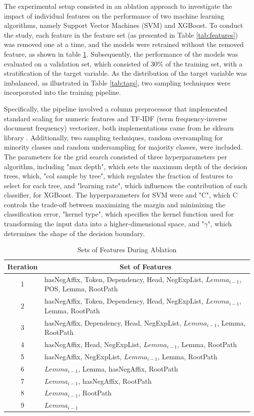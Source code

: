 The experimental setup consisted in an ablation approach to investigate the impact of individual features on the performance of two machine learning algorithms, namely Support Vector Machines (SVM) and XGBoost. To conduct the study, each feature in the feature set (as presented in Table \ref{tab:features}) was removed one at a time, and the models were retrained without the removed feature, as shown in table \ref{tab:ablation}. Subsequently, the performance of the models was evaluated on a validation set, which consisted of 30\% of the training set, with a stratification of the target variable. As the distribution of the target variable was imbalanced, as illustrated in Table \ref{tab:tags}, two sampling techniques were incorporated into the training pipeline.

Specifically, the pipeline involved a column preprocessor that implemented standard scaling for numeric features and TF-IDF (term frequency-inverse document frequency) vectorizer, both implementations came from he sklearn library \cite{scikit-learn}. Additionally, two sampling techniques, random oversampling for minority classes and random undersampling for majority classes, were included. The parameters for the grid search consisted of three hyperparameters per algorithm, including "max depth", which sets the maximum depth of the decision trees, which, "col sample by tree", which regulates the fraction of features to select for each tree, and "learning rate", which  influences the contribution of each classifier, for XGBoost. The hyperparameters for SVM were and "C", which  C controls the trade-off between maximizing the margin and minimizing the classification error, "kernel type", which specifies the kernel function used for transforming the input data into a higher-dimensional space, and "$\gamma$", which determines the shape of the decision boundary. 



\begin{table}[!ht]
\centering
\caption{\label{tab:ablation} Sets of Features During Ablation}
\begin{tabular}{cl}
\hline
\textbf{Iteration} & \multicolumn{1}{c}{\textbf{Set of Features}} \\
\hline
1 & hasNegAffix, Token, Dependency, Head, NegExpList, $Lemma_{i-1}$, POS, Lemma, RootPath \\
2 & hasNegAffix, Token, Dependency, Head, NegExpList, $Lemma_{i-1}$, Lemma, RootPath \\
3 & hasNegAffix, Dependency, Head, NegExpList, $Lemma_{i-1}$, Lemma, RootPath \\
4 & hasNegAffix, Head, NegExpList, $Lemma_{i-1}$, Lemma, RootPath \\
5 & hasNegAffix, NegExpList, $Lemma_{i-1}$, Lemma, RootPath \\
6 & $Lemma_{i-1}$, Lemma, hasNegAffix, RootPath \\
7 & $Lemma_{i-1}$, hasNegAffix, RootPath \\
8 & $Lemma_{i-1}$, RootPath \\
9 & $Lemma_{i-1}$ \\
\hline
\end{tabular}
\end{table}


